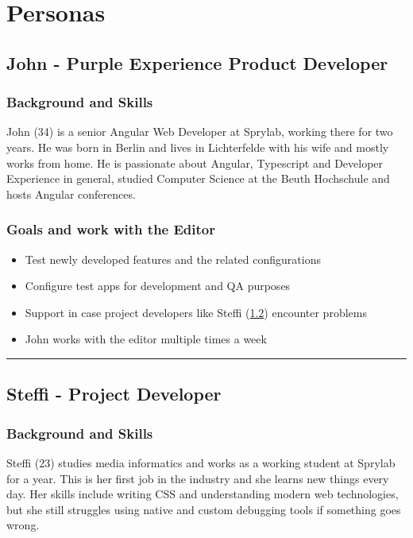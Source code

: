 
\chapter{Personas}
\label{app:personas}


\section{John - Purple Experience Product Developer}
\label{persona:productdev}
\subsection{Background and Skills}
John (34) is a senior Angular Web Developer at Sprylab, working there for two years. He was born in Berlin and lives in Lichterfelde with his wife and mostly works from home. He is passionate about Angular, Typescript and Developer Experience in general, studied Computer Science at the Beuth Hochschule and hosts Angular conferences.
\\
\subsection{Goals and work with the Editor}
\begin{itemize}[itemsep=0mm]
  \item Test newly developed features and the related configurations
  \item Configure test apps for development and QA purposes
  \item Support in case project developers like Steffi (\ref{persona:projectdev}) encounter problems
  \item John works with the editor multiple times a week
\end{itemize}

\hrule
\section{Steffi - Project Developer}
\label{persona:projectdev}
\subsection{Background and Skills}
Steffi (23) studies media informatics and works as a working student at Sprylab for a year. This is her first job in the industry and she learns new things every day. Her skills include writing CSS and understanding modern web technologies, but she still struggles using native and custom debugging tools if something goes wrong.  
\\
